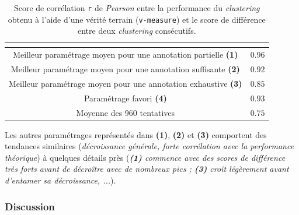 			\begin{table}[!htb]
				\begin{center}
				\begin{tabular}{|c|r|}
				
					\hline
					\rowcolor{colorTableHeader!15}
					\multicolumn{1}{|c|}{\shortstack[c]{
						Paramétrage
					}}
						& \multicolumn{1}{c|}{\shortstack[c]{
							Corrélation
						}}
						\tabularnewline
						\hline \hline
					
					Meilleur paramétrage moyen pour une annotation partielle \textbf{(1)}
						& $0.96$
						\tabularnewline
						\hline
					
					Meilleur paramétrage moyen pour une annotation suffisante \textbf{(2)}
						& $0.92$
						\tabularnewline
						\hline
					
					Meilleur paramétrage moyen pour une annotation exhaustive \textbf{(3)}
						& $0.85$
						\tabularnewline
						\hline
					
					Paramétrage favori \textbf{(4)}
						& $0.93$
						\tabularnewline
						\hline
					
					Moyenne des $960$ tentatives
						& $0.75$
						\tabularnewline
						\hline
					
				\end{tabular}
				\end{center}
				\caption{
					Score de corrélation \texttt{r} de \textit{Pearson} entre la performance du \textit{clustering} obtenu à l'aide d'une vérité terrain (\texttt{v-measure}) et le score de différence entre deux \textit{clustering} consécutifs.
				}
				\label{table:4.5.2-ETUDE-RENTABILITE-CORRELATION-SIMILARITE-PERFORMANCE}
			\end{table}
			
			Les autres paramétrages représentés dans \textbf{(1)}, \textbf{(2)} et \textbf{(3)} comportent des tendances similaires (\textit{décroissance générale, forte corrélation avec la performance théorique}) à quelques détails près (\textit{\textbf{(1)} commence avec des scores de différence très forts avant de décroître avec de nombreux pics ; \textbf{(3)} croît légèrement avant d'entamer sa décroissance, ...}).
			
		\subsubsection{Discussion}
		
